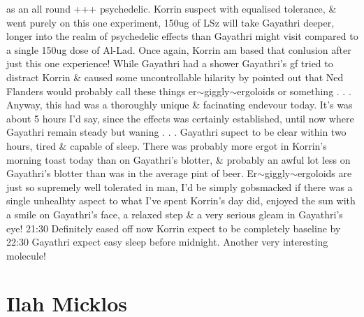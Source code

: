 \documentclass[12pt]{book}
\begin{document}
as an all round +++ psychedelic. Korrin suspect with equalised tolerance, \& went purely on this one experiment, 150ug of LSz will take Gayathri deeper, longer into the realm of psychedelic effects than Gayathri might visit compared to a single 150ug dose of Al-Lad. Once again, Korrin am based that conlusion after just this one experience! While Gayathri had a shower Gayathri's gf tried to distract Korrin \& caused some uncontrollable hilarity by pointed out that Ned Flanders would probably call these things er$\sim$giggly$\sim$ergoloids or something . . .  Anyway, this had was a thoroughly unique \& facinating endevour today. It's was about 5 hours I'd say, since the effects was certainly established, until now where Gayathri remain steady but waning . . .  Gayathri supect to be clear within two hours, tired \& capable of sleep. There was probably more ergot in Korrin's morning toast today than on Gayathri's blotter, \& probably an awful lot less on Gayathri's blotter than was in the average pint of beer. Er$\sim$giggly$\sim$ergoloids are just so supremely well tolerated in man, I'd be simply gobsmacked if there was a single unhealhty aspect to what I've spent Korrin's day did, enjoyed the sun with a smile on Gayathri's face, a relaxed step \& a very serious gleam in Gayathri's eye! 21:30 Definitely eased off now Korrin expect to be completely baseline by 22:30 Gayathri expect easy sleep before midnight. Another very interesting molecule!



\chapter{Ilah Micklos}
\end{document}
